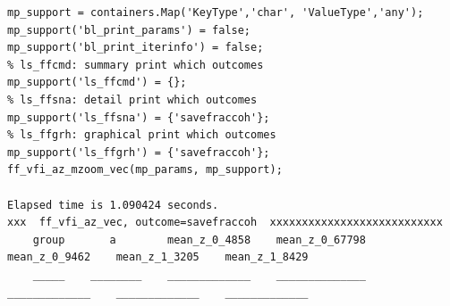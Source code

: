 \documentclass[
]{book}
\begin{document}
\begin{verbatim}
mp_support = containers.Map('KeyType','char', 'ValueType','any');
mp_support('bl_print_params') = false;
mp_support('bl_print_iterinfo') = false;
% ls_ffcmd: summary print which outcomes
mp_support('ls_ffcmd') = {};
% ls_ffsna: detail print which outcomes
mp_support('ls_ffsna') = {'savefraccoh'};
% ls_ffgrh: graphical print which outcomes
mp_support('ls_ffgrh') = {'savefraccoh'};
ff_vfi_az_mzoom_vec(mp_params, mp_support);

Elapsed time is 1.090424 seconds.
xxx  ff_vfi_az_vec, outcome=savefraccoh  xxxxxxxxxxxxxxxxxxxxxxxxxxx
    group       a        mean_z_0_4858    mean_z_0_67798    mean_z_0_9462    mean_z_1_3205    mean_z_1_8429
    _____    ________    _____________    ______________    _____________    _____________    _____________


\end{verbatim}
\end{document}
